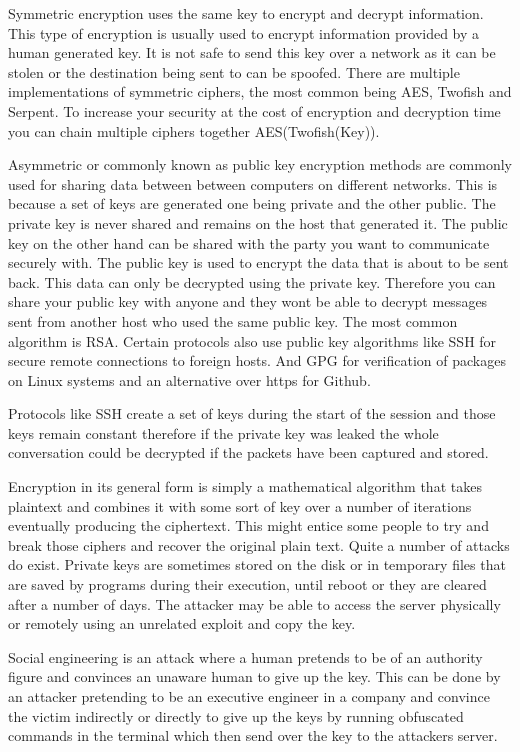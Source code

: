 Symmetric encryption uses the same key to encrypt and decrypt information. This type of encryption is usually used to encrypt information provided by a human generated key. It is not safe to send this key over a network as it can be stolen or the destination being sent to can be spoofed. There are multiple implementations of symmetric ciphers, the most common being AES, Twofish and Serpent. To increase your security at the cost of encryption and decryption time you can chain multiple ciphers together AES(Twofish(Key)).

Asymmetric or commonly known as public key encryption methods are commonly used for sharing data between between computers on different networks. This is because a set of keys are generated one being private and the other public. The private key is never shared and remains on the host that generated it. The public key on the other hand can be shared with the party you want to communicate securely with. The public key is used to encrypt the data that is about to be sent back. This data can only be decrypted using the private key. Therefore you can share your public key with anyone and they wont be able to decrypt messages sent from another host who used the same public key. The most common algorithm is RSA. Certain protocols also use public key algorithms like SSH for secure remote connections to foreign hosts. And GPG for verification of packages on Linux systems and an alternative over https for Github.

Protocols like SSH create a set of keys during the start of the session and those keys remain constant therefore if the private key was leaked the whole conversation could be decrypted if the packets have been captured and stored.  

Encryption in its general form is simply a mathematical algorithm that takes plaintext and combines it with some sort of key over a number of iterations eventually producing the ciphertext. This might entice some people to try and break those ciphers and recover the original plain text. Quite a number of attacks do exist.
Private keys are sometimes stored on the disk or in temporary files that are saved by programs during their execution, until reboot or they are cleared after a number of days. The attacker may be able to access the server physically or remotely using an unrelated exploit and copy the key.

Social engineering is an attack where a human pretends to be of an authority figure and convinces an unaware human to give up the key. This can be done by an attacker pretending to be an executive engineer in a company and convince the victim indirectly or directly to give up the keys by running obfuscated commands in the terminal which then send over the key to the attackers server.


